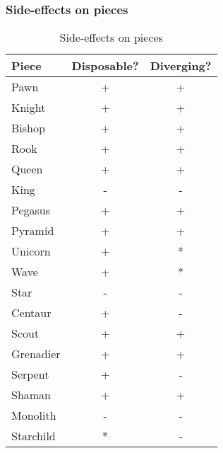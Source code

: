 
\subsubsection*{Side-effects on pieces}
\label{sec:Appendix/Summary/Side-effects/Side-effects on pieces}

\begin{table}[!h]
\centering
\begin{tabular}{ lcc }
\toprule %
\textbf{Piece} & \textbf{Disposable?} & \textbf{Diverging?}   \\
\midrule %
Pawn           & +                    & +                     \\
Knight         & +                    & +                     \\
Bishop         & +                    & +                     \\
Rook           & +                    & +                     \\
Queen          & +                    & +                     \\
King           & -                    & -                     \\
\cmidrule{1-3} %
Pegasus        & +                    & +                     \\
Pyramid        & +                    & +                     \\
Unicorn        & +                    & *\footnotemark[2]     \\
Wave           & +                    & *\footnotemark[3]     \\
Star           & -                    & -                     \\
Centaur        & +                    & -                     \\
Scout          & +                    & +                     \\
Grenadier      & +                    & +                     \\
Serpent        & +                    & -                     \\
Shaman         & +                    & +                     \\
Monolith       & -                    & -                     \\
Starchild      & *\footnotemark[1]    & -                     \\
\bottomrule %
\end{tabular}
\caption{Side-effects on pieces}
\label{tbl:Appendix/Summary/Side-effects/Side-effects on pieces}
\end{table}

